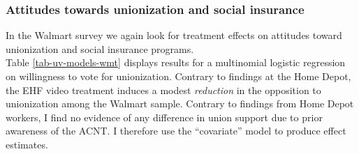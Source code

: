 \documentclass[
  11pt,
  oneside]{article}
\begin{document}
\subsubsection{Attitudes towards unionization and social insurance}\label{attitudes-towards-unionization-and-social-insurance}

In the Walmart survey we again look for treatment effects on attitudes toward unionization and social insurance programs.\\
Table \ref{tab-uv-models-wmt} displays results for a multinomial logistic regression on willingness to vote for unionization. Contrary to findings at the Home Depot, the EHF video treatment induces a modest \emph{reduction} in the opposition to unionization among the Walmart sample. Contrary to findings from Home Depot workers, I find no evidence of any difference in union support due to prior awareness of the ACNT. I therefore use the ``covariate'' model to produce effect estimates.\\
\end{document}
